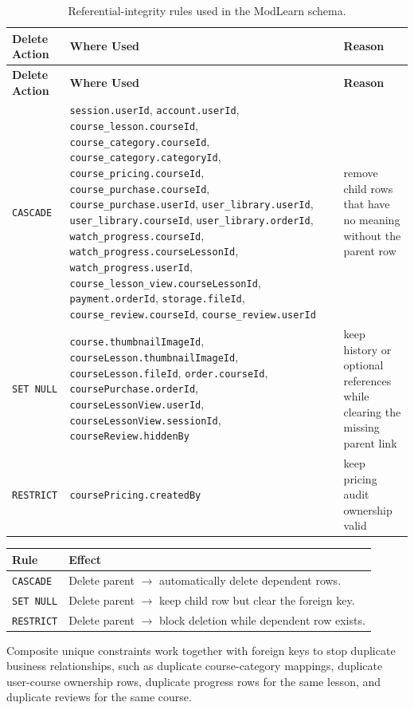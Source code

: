 \begingroup
\small
\renewcommand{\arraystretch}{1.15}
\begin{longtable}{L{2.4cm}L{6.4cm}L{4.4cm}}
\caption{Referential-integrity rules used in the ModLearn schema.}\label{tab:ri-summary}\\
\toprule
\textbf{Delete Action} & \textbf{Where Used} & \textbf{Reason} \\
\midrule
\endfirsthead
\toprule
\textbf{Delete Action} & \textbf{Where Used} & \textbf{Reason} \\
\midrule
\endhead
\bottomrule
\endfoot
\texttt{CASCADE} & \texttt{session.userId}, \texttt{account.userId}, \texttt{course\_lesson.courseId}, \texttt{course\_category.courseId}, \texttt{course\_category.categoryId}, \texttt{course\_pricing.courseId}, \texttt{course\_purchase.courseId}, \texttt{course\_purchase.userId}, \texttt{user\_library.userId}, \texttt{user\_library.courseId}, \texttt{user\_library.orderId}, \texttt{watch\_progress.courseId}, \texttt{watch\_progress.courseLessonId}, \texttt{watch\_progress.userId}, \texttt{course\_lesson\_view.courseLessonId}, \texttt{payment.orderId}, \texttt{storage.fileId}, \texttt{course\_review.courseId}, \texttt{course\_review.userId} & remove child rows that have no meaning without the parent row \\
\texttt{SET NULL} & \texttt{course.thumbnailImageId}, \texttt{courseLesson.thumbnailImageId}, \texttt{courseLesson.fileId}, \texttt{order.courseId}, \texttt{coursePurchase.orderId}, \texttt{courseLessonView.userId}, \texttt{courseLessonView.sessionId}, \texttt{courseReview.hiddenBy} & keep history or optional references while clearing the missing parent link \\
\texttt{RESTRICT} & \texttt{coursePricing.createdBy} & keep pricing audit ownership valid \\
\end{longtable}

\begin{center}
\begin{tabular}{L{2.7cm}L{8.8cm}}
\toprule
\textbf{Rule} & \textbf{Effect} \\
\midrule
\texttt{CASCADE} & Delete parent $\rightarrow$ automatically delete dependent rows. \\
\texttt{SET NULL} & Delete parent $\rightarrow$ keep child row but clear the foreign key. \\
\texttt{RESTRICT} & Delete parent $\rightarrow$ block deletion while dependent row exists. \\
\bottomrule
\end{tabular}
\end{center}
\endgroup

\noindent
Composite unique constraints work together with foreign keys to stop duplicate business relationships, such as duplicate course-category mappings, duplicate user-course ownership rows, duplicate progress rows for the same lesson, and duplicate reviews for the same course.
